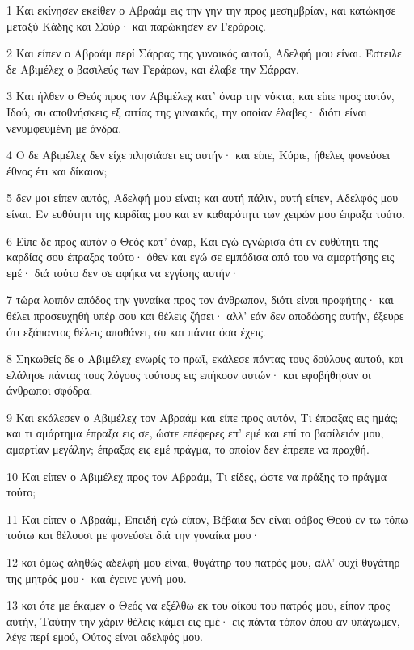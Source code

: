 \par 1 Και εκίνησεν εκείθεν ο Αβραάμ εις την γην την προς μεσημβρίαν, και κατώκησε μεταξύ Κάδης και Σούρ· και παρώκησεν εν Γεράροις.
\par 2 Και είπεν ο Αβραάμ περί Σάρρας της γυναικός αυτού, Αδελφή μου είναι. Έστειλε δε Αβιμέλεχ ο βασιλεύς των Γεράρων, και έλαβε την Σάρραν.
\par 3 Και ήλθεν ο Θεός προς τον Αβιμέλεχ κατ' όναρ την νύκτα, και είπε προς αυτόν, Ιδού, συ αποθνήσκεις εξ αιτίας της γυναικός, την οποίαν έλαβες· διότι είναι νενυμφευμένη με άνδρα.
\par 4 Ο δε Αβιμέλεχ δεν είχε πλησιάσει εις αυτήν· και είπε, Κύριε, ήθελες φονεύσει έθνος έτι και δίκαιον;
\par 5 δεν μοι είπεν αυτός, Αδελφή μου είναι; και αυτή πάλιν, αυτή είπεν, Αδελφός μου είναι. Εν ευθύτητι της καρδίας μου και εν καθαρότητι των χειρών μου έπραξα τούτο.
\par 6 Είπε δε προς αυτόν ο Θεός κατ' όναρ, Και εγώ εγνώρισα ότι εν ευθύτητι της καρδίας σου έπραξας τούτο· όθεν και εγώ σε εμπόδισα από του να αμαρτήσης εις εμέ· διά τούτο δεν σε αφήκα να εγγίσης αυτήν·
\par 7 τώρα λοιπόν απόδος την γυναίκα προς τον άνθρωπον, διότι είναι προφήτης· και θέλει προσευχηθή υπέρ σου και θέλεις ζήσει· αλλ' εάν δεν αποδώσης αυτήν, έξευρε ότι εξάπαντος θέλεις αποθάνει, συ και πάντα όσα έχεις.
\par 8 Σηκωθείς δε ο Αβιμέλεχ ενωρίς το πρωΐ, εκάλεσε πάντας τους δούλους αυτού, και ελάλησε πάντας τους λόγους τούτους εις επήκοον αυτών· και εφοβήθησαν οι άνθρωποι σφόδρα.
\par 9 Και εκάλεσεν ο Αβιμέλεχ τον Αβραάμ και είπε προς αυτόν, Τι έπραξας εις ημάς; και τι αμάρτημα έπραξα εις σε, ώστε επέφερες επ' εμέ και επί το βασίλειόν μου, αμαρτίαν μεγάλην; έπραξας εις εμέ πράγμα, το οποίον δεν έπρεπε να πραχθή.
\par 10 Και είπεν ο Αβιμέλεχ προς τον Αβραάμ, Τι είδες, ώστε να πράξης το πράγμα τούτο;
\par 11 Και είπεν ο Αβραάμ, Επειδή εγώ είπον, Βέβαια δεν είναι φόβος Θεού εν τω τόπω τούτω και θέλουσι με φονεύσει διά την γυναίκα μου·
\par 12 και όμως αληθώς αδελφή μου είναι, θυγάτηρ του πατρός μου, αλλ' ουχί θυγάτηρ της μητρός μου· και έγεινε γυνή μου.
\par 13 και ότε με έκαμεν ο Θεός να εξέλθω εκ του οίκου του πατρός μου, είπον προς αυτήν, Ταύτην την χάριν θέλεις κάμει εις εμέ· εις πάντα τόπον όπου αν υπάγωμεν, λέγε περί εμού, Ούτος είναι αδελφός μου.
